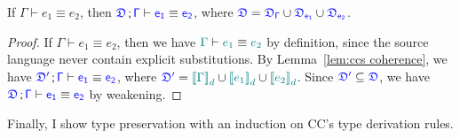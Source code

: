 \begin{lemma}[Coherence] 
\label{lem:coherence}
If $\Gamma \vdash e_1 \equiv e_2$, then $\targetcon \vdash \target{e_1} \equiv \target{e_2}$, where
$\target{\fdef} = \target{\fdef_{\Gamma}} \cup \target{\fdef_{e_1}} \cup \target{\fdef_{e_2}}$.
\begin{proof}
If $\Gamma \vdash e_1 \equiv e_2$, then we have $\color{teal}{\Gamma}\color{black} \vdash \color{teal}{e_1}\color{black} \equiv \color{teal}{e_2}\color{black}$
by definition, since the source language never contain explicit substitutions. By Lemma~\ref{lem:ccs coherence}, we have $\target{\fdef'} \semicolon \target{\Gamma} \vdash \target{e_1} \equiv \target{e_2}$, where
$\target{\fdef'} = \helper{\bbracket{\Gamma}_d} \cup \helper{\bbracket{e_1}_d} \cup \helper{\bbracket{e_2}_d}$.
Since $\target{\fdef'} \subseteq \target{\fdef}$, we have $\targetcon \vdash \target{e_1} \equiv \target{e_2}$ by weakening.
\end{proof}
\end{lemma}

Finally, I show type preservation with an induction on CC's type derivation rules. 

